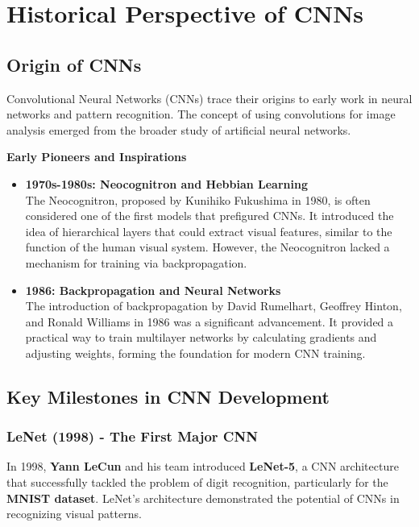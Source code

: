 \chapter{Historical Perspective of CNNs}\label{chp:2}
\section{Origin of CNNs}

Convolutional Neural Networks (CNNs) trace their origins to early work in neural networks and pattern recognition. The concept of using convolutions for image analysis emerged from the broader study of artificial neural networks.

\textbf{Early Pioneers and Inspirations}
\begin{itemize}
    \item \textbf{1970s-1980s: Neocognitron and Hebbian Learning}\\
    The Neocognitron, proposed by Kunihiko Fukushima in 1980, is often considered one of the first models that prefigured CNNs. It introduced the idea of hierarchical layers that could extract visual features, similar to the function of the human visual system. However, the Neocognitron lacked a mechanism for training via backpropagation.\cite{fukushima1980neocognitron}

    \item \textbf{1986: Backpropagation and Neural Networks}\\
    The introduction of backpropagation by David Rumelhart, Geoffrey Hinton, and Ronald Williams in 1986 was a significant advancement. It provided a practical way to train multilayer networks by calculating gradients and adjusting weights, forming the foundation for modern CNN training.\cite{rumelhart1986learning}
\end{itemize}

\section{Key Milestones in CNN Development}

\subsection{LeNet (1998) - The First Major CNN}
In 1998, \textbf{Yann LeCun} and his team introduced \textbf{LeNet-5}, a CNN architecture that successfully tackled the problem of digit recognition, particularly for the \textbf{MNIST dataset}. LeNet’s architecture demonstrated the potential of CNNs in recognizing visual patterns.\cite{lecun1998gradient} \cite{lecun1990handwritten}

